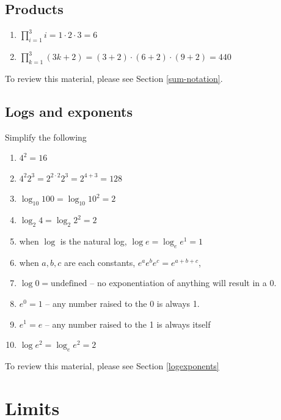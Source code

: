 \documentclass[
]{book}
\providecommand{\tightlist}{%
  \setlength{\itemsep}{0pt}\setlength{\parskip}{0pt}}
\theoremstyle{definition}
\theoremstyle{definition}
\theoremstyle{definition}
\theoremstyle{definition}
\theoremstyle{remark}
\begin{document}
\hypertarget{products-1}{%
\subsection*{Products}\label{products-1}}

\begin{enumerate}
\def\labelenumi{\arabic{enumi}.}
\item
  \(\prod\limits_{i= 1}^3 i = 1\cdot 2\cdot 3 = 6\)
\item
  \(\prod\limits_{k=1}^3(3k + 2) = (3 + 2)\cdot (6 + 2)\cdot (9 + 2) = 440\)
\end{enumerate}

To review this material, please see Section \ref{sum-notation}.

\hypertarget{logs-and-exponents-1}{%
\subsection*{Logs and exponents}\label{logs-and-exponents-1}}

Simplify the following

\begin{enumerate}
\def\labelenumi{\arabic{enumi}.}
\tightlist
\item
  \(4^2 = 16\)
\item
  \(4^2 2^3 = 2^{2\cdot 2}2^{3} = 2^{4 + 3} = 128\)
\item
  \(\log_{10}100 = \log_{10}10^2 = 2\)
\item
  \(\log_{2}4 = \log_{2}2^2 = 2\)
\item
  when \(\log\) is the natural log, \(\log e = \log_{e} e^1 = 1\)
\item
  when \(a, b, c\) are each constants, \(e^a e^b e^c = e^{a + b + c}\),
\item
  \(\log 0 = \text{undefined}\) -- no exponentiation of anything will result in a 0.
\item
  \(e^0 = 1\) -- any number raised to the 0 is always 1.
\item
  \(e^1 = e\) -- any number raised to the 1 is always itself
\item
  \(\log e^2 = \log_e e^2 = 2\)
\end{enumerate}

To review this material, please see Section \ref{logexponents}

\hypertarget{limits-1}{%
\section*{Limits}\label{limits-1}}
\end{document}

